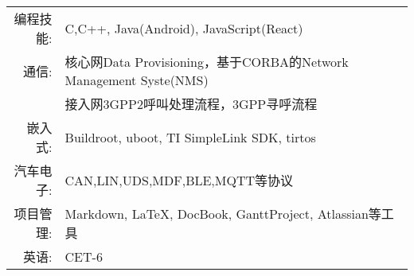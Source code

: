 %
%


 
\renewcommand{\arraystretch}{1.1}

	\begin{tabular}{>{}r>{}p{13cm}} 
		\textsc{编程技能:}      & C,C++, Java(Android), JavaScript(React)\\  
		\textsc{通信:} 		   & 核心网Data Provisioning，基于CORBA的Network Management Syste(NMS)\\
							   & 接入网3GPP2呼叫处理流程，3GPP寻呼流程 \\
		\textsc{嵌入式:}	   & Buildroot, uboot, TI SimpleLink SDK, tirtos  \\
		\textsc{汽车电子:}	   & CAN,LIN,UDS,MDF,BLE,MQTT等协议 \\
		\textsc{项目管理:}	   & Markdown, LaTeX, DocBook, GanttProject, Atlassian等工具 \\
		\textsc{英语:}	    &  CET-6 \\
	\end{tabular}
	
